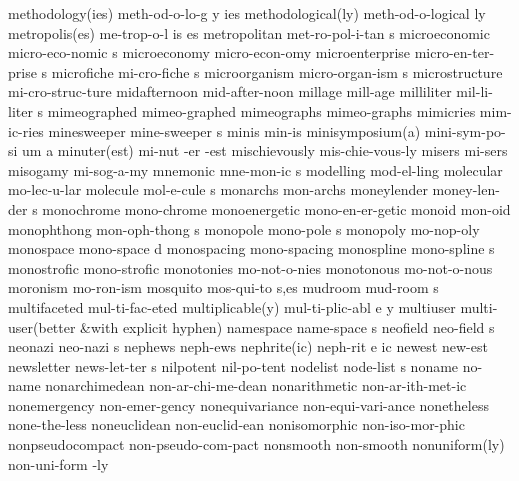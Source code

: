\NewWordtrue
\3 methodology(ies)	meth-od-o-lo-g y ies	%
\NewWordtrue
\2 methodological(ly)	meth-od-o-logical ly    %
\3 metropolis(es)	me-trop-o-l is es
\5 metropolitan		met-ro-pol-i-tan s
\5 microeconomic	micro-eco-nomic s
\1 microeconomy		micro-econ-omy		%
\5 microenterprise	micro-en-ter-prise s	%
\5 microfiche		mi-cro-fiche s
\5 microorganism	micro-organ-ism s	%
\1 microstructure	mi-cro-struc-ture	%
\1 midafternoon 	mid-after-noon		%
\1 millage		mill-age
\5 milliliter		mil-li-liter s
\1 mimeographed 	mimeo-graphed
\1 mimeographs		mimeo-graphs
\1 mimicries		mim-ic-ries
\5 minesweeper		mine-sweeper s		%
\1 minis		min-is
\3 minisymposium(a)	mini-sym-po-si um a
\3 minuter(est)		mi-nut -er -est
\1 mischievously	mis-chie-vous-ly
\1 misers		mi-sers
\1 misogamy		mi-sog-a-my
\5 mnemonic		mne-mon-ic s		%
\1 modelling		mod-el-ling
\1 molecular		mo-lec-u-lar		%
\5 molecule		mol-e-cule s
\1 monarchs		mon-archs
\5 moneylender		money-len-der s
\1 monochrome		mono-chrome
\1 monoenergetic	mono-en-er-getic
\1 monoid		mon-oid
\5 monophthong		mon-oph-thong s		%
\5 monopole		mono-pole s
\1 monopoly		mo-nop-oly
\5 monospace		mono-space d		%
\1 monospacing		mono-spacing		%
\5 monospline		mono-spline s
\1 monostrofic		mono-strofic
\1 monotonies		mo-not-o-nies
\1 monotonous		mo-not-o-nous
\1 moronism		mo-ron-ism
\5 mosquito		mos-qui-to s,es
\5 mudroom		mud-room s
\1 multifaceted 	mul-ti-fac-eted
\3 multiplicable(y)	mul-ti-plic-abl e y
\1 multiuser		multi-user\quad (better
\tabalign		&\null\quad with explicit hyphen)\cr
\5 namespace		name-space s		%
\5 neofield		neo-field s
\5 neonazi		neo-nazi s
\1 nephews		neph-ews		%
\3 nephrite(ic)		neph-rit e ic		%
\1 newest		new-est 		%
\5 newsletter		news-let-ter s
\1 nilpotent            nil-po-tent             %
\5 nodelist		node-list s		%
\1 noname		no-name
\NewWordtrue
\1 nonarchimedean	non-ar-chi-me-dean	%
\1 nonarithmetic	non-ar-ith-met-ic	%
\1 nonemergency 	non-emer-gency
\1 nonequivariance	non-equi-vari-ance
\1 nonetheless		none-the-less        %
\1 noneuclidean 	non-euclid-ean
\1 nonisomorphic	non-iso-mor-phic
\1 nonpseudocompact	non-pseudo-com-pact
\1 nonsmooth		non-smooth
\2 nonuniform(ly)	non-uni-form -ly
